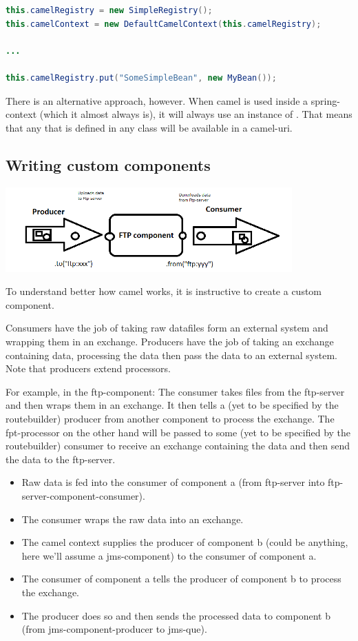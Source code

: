 \begin{lstlisting}[language=java]
this.camelRegistry = new SimpleRegistry();
this.camelContext = new DefaultCamelContext(this.camelRegistry);

...

this.camelRegistry.put("SomeSimpleBean", new MyBean());
\end{lstlisting}

There is an alternative approach, however. When camel is used inside a spring-context (which it almost always is), it will always use an instance of . That means that any  that is defined in any  class will be available in a camel-uri.


\subsection{Writing custom components}

\includegraphics[width=11cm]{images/camel.png}

To understand better how camel works, it is instructive to create a custom component.

Consumers have the job of taking raw datafiles form an external system and wrapping them in an exchange. 
Producers have the job of taking an exchange containing data, processing the data then pass the data to an external system. 
Note that producers extend processors. 

For example, in the ftp-component: 
The consumer takes files from the ftp-server and then wraps them in an exchange. It then tells a (yet to be specified by the routebuilder) producer from another component to process the exchange. 
The fpt-processor on the other hand will be passed to some (yet to be specified by the routebuilder) consumer to receive an exchange containing the data and then send the data to the ftp-server.

\begin{itemize}
    \item Raw data is fed into the consumer of component a (from ftp-server into ftp-server-component-consumer). 
    \item The consumer wraps the raw data into an exchange.
    \item The camel context supplies the producer of component b (could be anything, here we'll assume a jms-component) to the consumer of component a.
    \item The consumer of component a tells the producer of component b to process the exchange. 
    \item The producer does so and then sends the processed data to component b (from jms-component-producer to jms-que).
\end{itemize}

